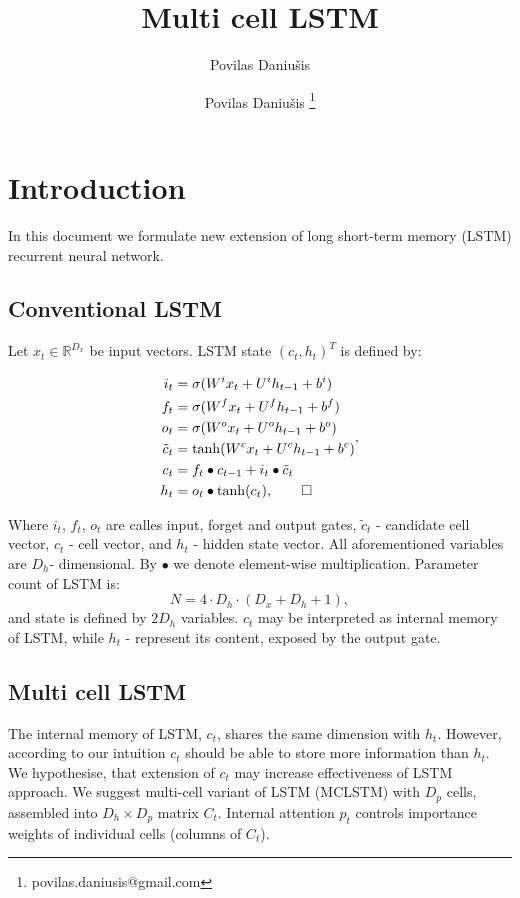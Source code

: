 \documentclass[a4paper,11pt]{article}
\author{Povilas Daniu\v{s}is}
\author[1]{Povilas Daniu\v{s}is \thanks{povilas.daniusis@gmail.com}}
\title{Multi cell LSTM}
\begin{document}
\maketitle
\section{Introduction}

In this document we formulate new extension of long short-term memory (LSTM) recurrent neural network. 

\subsection{Conventional LSTM}
Let $x_{t} \in \mathbb{R}^{D_{x}}$ be input vectors. LSTM state $(c_{t}, h_{t})^{T}$ is defined by:

\begin{align}
\begin{split}
\label{LSTM}
i_{t} &=\sigma(W^{i}x_{t} + U^{i}h_{t-1} + b^{i})\\
f_{t} &=\sigma(W^{f}x_{t} + U^{f}h_{t-1} + b^{f})\\
o_{t} &=\sigma(W^{o}x_{t} + U^{o}h_{t-1} + b^{o})\\
\tilde{c}_{t} &= \tanh(W^{c}x_{t} + U^{c}h_{t-1} + b^{c})\\
c_{t} &=f_{t} \bullet c_{t-1} + i_{t} \bullet \tilde{c}_{t}\\
h_{t} &=o_{t} \bullet \tanh(c_{t}), \qedhere
\end{split},
\end{align}

Where $i_{t}$, $f_{t}$, $o_{t}$ are calles input, forget and output gates, $\tilde{c}_{t}$ - candidate cell vector, $c_{t}$ - cell vector, and $h_{t}$ - hidden state vector. All aforementioned variables are $D_{h}$- dimensional. By $\bullet$ we denote element-wise multiplication. Parameter count of LSTM is:
\begin{equation}
\label{eq:lstm_parameter_count}
N =  4 \cdot D_{h} \cdot (D_{x}  + D_{h} + 1),
\end{equation}
and state is defined by $2 D_{h}$ variables.
$c_{t}$ may be interpreted as internal memory of LSTM, while $h_{t}$ - represent its content, exposed by the output gate.  

\subsection{Multi cell LSTM} 
The internal memory of LSTM, $c_{t}$, shares the same dimension with $h_{t}$. However, according to our intuition $c_{t}$ should be able to store more information than $h_{t}$. We hypothesise, that extension of $c_{t}$ may increase effectiveness of LSTM approach. We suggest multi-cell variant of LSTM (MCLSTM) with $D_{p}$ cells, assembled into $D_{h} 
\times D_{p}$ matrix $C_{t}$. Internal attention $p_{t}$ controls importance weights of individual cells (columns of $C_{t}$).
\end{document}
